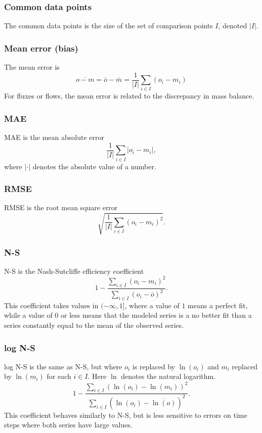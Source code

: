 \documentclass[11pt]{article}
\theoremstyle{definition}
\begin{document}
\subsubsection{Common data points}
The common data points is the size of the set of comparison points $I$, denoted $|I|$.

\subsubsection{Mean error (bias)}
The mean error is
\[
\overline{o - m} = \overline{o} -\overline{m} =\frac{1}{|I|} \sum_{i\in I} (o_i - m_i)
\]
For fluxes or flows, the mean error is related to the discrepancy in mass balance.

\subsubsection{MAE}
MAE is the mean absolute error
\[
\frac{1}{|I|}\sum_{i\in I}|o_i - m_i|,
\]
where $|\cdot|$ denotes the absolute value of a number.

\subsubsection{RMSE}
RMSE is the root mean square error
\[
\sqrt{\frac{1}{|I|}\sum_{i\in I}(o_i-m_i)^2}.
\]

\subsubsection{N-S}
N-S is the Nash-Sutcliffe efficiency coefficient \cite{nashsutcliffe70}
\[
1 - \frac{\sum_{i\in I}(o_i - m_i)^2}{\sum_{i\in I}(o_i-\overline{o})^2}.
\]
This coefficient takes values in $(-\infty, 1]$, where a value of $1$ means a perfect fit, while a value of $0$ or less means that the modeled series is a no better fit than a series constantly equal to the mean of the observed series.

\subsubsection{log N-S}
log N-S is the same as N-S, but where $o_i$ is replaced by $\ln(o_i)$ and $m_i$ replaced by $\ln(m_i)$ for each $i\in I$. Here $\ln$ denotes the natural logarithm.
\[
1 - \frac{\sum_{i\in I}(\ln(o_i) - \ln(m_i))^2}{\sum_{i\in I}(\ln(o_i)-\overline{\ln(o)})^2}.
\]
This coefficient behaves similarly to N-S, but is less sensitive to errors on time steps where both series have large values.
\end{document}
